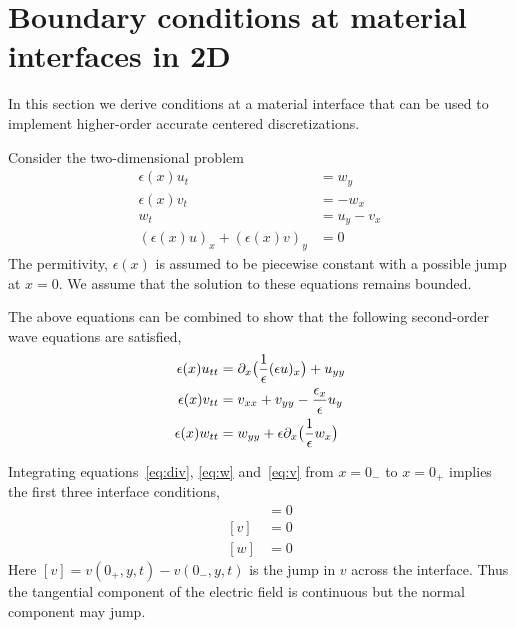 \section{Boundary conditions at material interfaces in 2D}


In this section we derive conditions at a material interface that can be used to
implement higher-order accurate centered discretizations.


Consider the two-dimensional problem 
\begin{align}
  \epsilon(x) u_t & = w_y \label{eq:u} \\
  \epsilon(x) v_t &= -w_x \label{eq:v} \\
   w_t &= u_y - v_x  \label{eq:w} \\
  (\epsilon(x) u)_x + (\epsilon(x) v)_y &= 0 \label{eq:div}
\end{align}
The permitivity, $\epsilon(x)$ is assumed to be piecewise constant with a possible jump at $x=0$.
We assume that the solution to these equations remains bounded.


The above equations can be combined to show that the following second-order wave equations are satisfied,
\begin{align}
  \epsilon(x) u_{tt} & = \partial_x\big( {1\over\epsilon} (\epsilon u)_x\big) + u_{yy} \label{eq:uwave} \\
  \epsilon(x) v_{tt} &= v_{xx} + v_{yy} - {\epsilon_x\over\epsilon} u_y  \label{eq:vwave} \\
  \epsilon(x) w_{tt} &= w_{yy} + \epsilon \partial_x\big( {1\over\epsilon} w_x \big) \label{eq:wwave} 
\end{align}




Integrating equations~\eqref{eq:div}, \eqref{eq:w} and~\eqref{eq:v} 
from $x=0_-$ to $x=0_+$ implies the first three interface conditions,
\begin{align}
     [ \epsilon u ] &=0   \\
     [ v ] & = 0  \\
     [ w ] & = 0 
\end{align}
Here $[v] = v(0_+,y,t) - v(0_-,y,t)$ is the jump in $v$ across the interface.
Thus the tangential component of the electric field is continuous but the normal component may jump.


